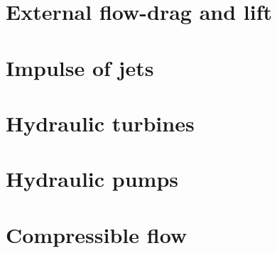 \documentclass[8pt]{report}
\begin{document}
\chapter{External flow-drag and lift}
\chapter{Impulse of jets}
\chapter{Hydraulic turbines}
\chapter{Hydraulic pumps}
\chapter{Compressible flow}
\end{document}
